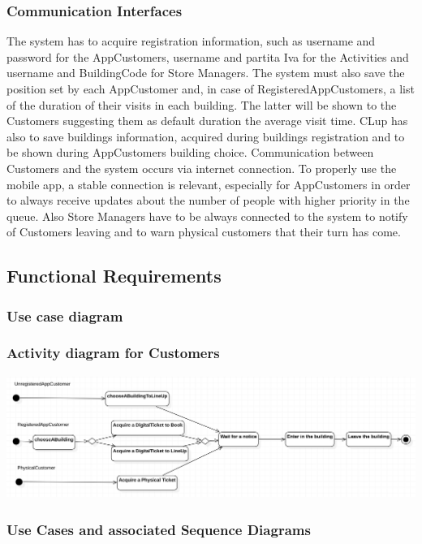 \documentclass{article}
\begin{document}
	\subsubsection {Communication Interfaces}
	The system has to acquire registration information, such as username and password for the AppCustomers, username and partita Iva for the Activities and username and BuildingCode for Store Managers. The system must also save the position set by each AppCustomer and, in case of RegisteredAppCustomers, a list of the duration of their visits in each building. The latter will be shown to the Customers suggesting them as default duration the average visit time. CLup has also to save buildings information, acquired during buildings registration and to be shown during AppCustomers building choice. Communication between Customers and the system occurs via internet connection. To properly use the mobile app, a stable connection is relevant, especially for AppCustomers in order to always receive updates about the number of people with higher priority in the queue. Also Store Managers have to be always connected to the system to notify of Customers leaving and to warn physical customers that their turn has come.
	
	\subsection{Functional Requirements}
	\subsubsection{Use case diagram}
	
	\subsubsection{Activity diagram for Customers}
	\includegraphics[height=4cm]{ActivityDiagram}\\
	\subsubsection{Use Cases and associated Sequence Diagrams}
\end{document}

